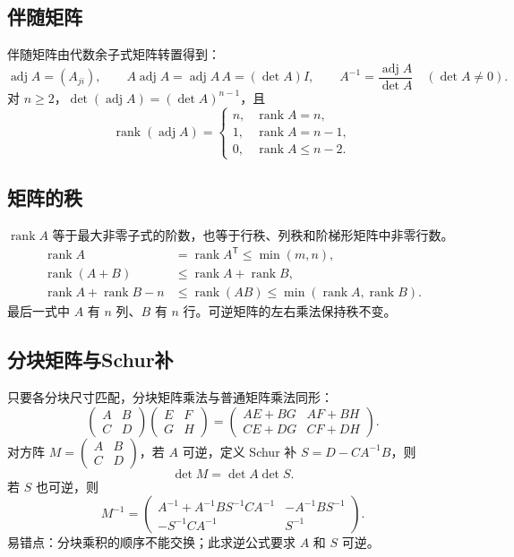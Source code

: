 \documentclass[../main.tex]{subfiles}
\begin{document}
\subsection{伴随矩阵}
伴随矩阵由代数余子式矩阵转置得到：
\[
\operatorname{adj}A=(A_{ji}),\qquad
A\operatorname{adj}A=\operatorname{adj}A\,A=(\det A)I,\qquad
A^{-1}=\frac{\operatorname{adj}A}{\det A}\quad(\det A\ne0).
\]
对 $n\ge2$，$\det(\operatorname{adj}A)=(\det A)^{n-1}$，且
\[
\operatorname{rank}(\operatorname{adj}A)=
\begin{cases}n,&\operatorname{rank}A=n,\\1,&\operatorname{rank}A=n-1,\\0,&\operatorname{rank}A\le n-2.\end{cases}
\]
\subsection{矩阵的秩}
$\operatorname{rank}A$ 等于最大非零子式的阶数，也等于行秩、列秩和阶梯形矩阵中非零行数。
\begin{align*}
\operatorname{rank}A&=\operatorname{rank}A^{\mathsf T}\le\min(m,n),\\
\operatorname{rank}(A+B)&\le\operatorname{rank}A+\operatorname{rank}B,\\
\operatorname{rank}A+\operatorname{rank}B-n
&\le\operatorname{rank}(AB)\le\min(\operatorname{rank}A,\operatorname{rank}B).
\end{align*}
最后一式中 $A$ 有 $n$ 列、$B$ 有 $n$ 行。可逆矩阵的左右乘法保持秩不变。
\subsection{分块矩阵与Schur补}
只要各分块尺寸匹配，分块矩阵乘法与普通矩阵乘法同形：
\[
\begin{pmatrix}A&B\\C&D\end{pmatrix}
\begin{pmatrix}E&F\\G&H\end{pmatrix}
=\begin{pmatrix}AE+BG&AF+BH\\CE+DG&CF+DH\end{pmatrix}.
\]
对方阵 $M=\begin{pmatrix}A&B\\C&D\end{pmatrix}$，若 $A$ 可逆，定义 Schur 补 $S=D-CA^{-1}B$，则
\[
\det M=\det A\det S.
\]
若 $S$ 也可逆，则
\[
M^{-1}=\begin{pmatrix}
A^{-1}+A^{-1}BS^{-1}CA^{-1}&-A^{-1}BS^{-1}\\
-S^{-1}CA^{-1}&S^{-1}
\end{pmatrix}.
\]
易错点：分块乘积的顺序不能交换；此求逆公式要求 $A$ 和 $S$ 可逆。
\end{document}
